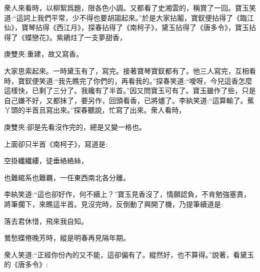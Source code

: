 \begin{parag}
    衆人來看時，以柳絮爲題，限各色小調。又都看了史湘雲的，稱賞了一回。寶玉笑道:“這詞上我們平常，少不得也要胡謅起來。”於是大家拈鬮，寶釵便拈得了《臨江仙》，寶琴拈得《西江月》，探春拈得了《南柯子》，黛玉拈得了《唐多令》，寶玉拈得了《蝶戀花》。紫鵑炷了一支夢甜香，\begin{note}庚雙夾:重建，故又寫香。\end{note}大家思索起來。一時黛玉有了，寫完。接著寶琴寶釵都有了。他三人寫完，互相看時，寶釵便笑道:“我先瞧完了你們的，再看我的。”探春笑道:“噯呀，今兒這香怎麼這樣快，已剩了三分了。我纔有了半首。”因又問寶玉可有了。寶玉雖作了些，只是自己嫌不好，又都抹了，要另作，回頭看香，已將燼了。李紈笑道:“這算輸了。蕉丫頭的半首且寫出來。”探春聽說，忙寫了出來。衆人看時，\begin{note}庚雙夾:卻是先看沒作完的，總是又變一格也。\end{note}上面卻只半首《南柯子》，寫道是:
\end{parag}


\begin{poem}
    \begin{pl}空掛纖纖縷，徒垂絡絡絲，\end{pl}

    \begin{pl}也難綰系也難羈，一任東西南北各分離。\end{pl}
\end{poem}


\begin{parag}
    李紈笑道:“這也卻好作，何不續上？”寶玉見香沒了，情願認負，不肯勉強塞責，將筆擱下，來瞧這半首。見沒完時，反倒動了興開了機，乃提筆續道是:
\end{parag}


\begin{poem}
    \begin{pl}落去君休惜，飛來我自知。\end{pl}

    \begin{pl}鶯愁蝶倦晚芳時，縱是明春再見隔年期。\end{pl}

\end{poem}


\begin{parag}
    衆人笑道:“正經你份內的又不能，這卻偏有了。縱然好，也不算得。”說著，看黛玉的《唐多令》:
\end{parag}


